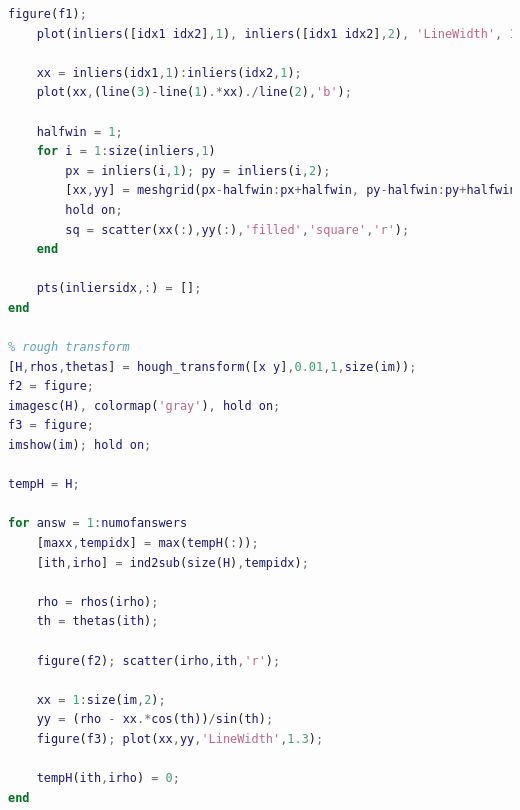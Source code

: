 \documentclass{article}
\begin{document}
\begin{lstlisting}[language=Matlab]
    figure(f1);
    plot(inliers([idx1 idx2],1), inliers([idx1 idx2],2), 'LineWidth', 1.2);

    xx = inliers(idx1,1):inliers(idx2,1);
    plot(xx,(line(3)-line(1).*xx)./line(2),'b');
    
    halfwin = 1;
    for i = 1:size(inliers,1)
        px = inliers(i,1); py = inliers(i,2);
        [xx,yy] = meshgrid(px-halfwin:px+halfwin, py-halfwin:py+halfwin);
        hold on;
        sq = scatter(xx(:),yy(:),'filled','square','r');
    end
    
    pts(inliersidx,:) = [];
end

% rough transform
[H,rhos,thetas] = hough_transform([x y],0.01,1,size(im));
f2 = figure;
imagesc(H), colormap('gray'), hold on;
f3 = figure;
imshow(im); hold on;

tempH = H;

for answ = 1:numofanswers
    [maxx,tempidx] = max(tempH(:));
    [ith,irho] = ind2sub(size(H),tempidx);
    
    rho = rhos(irho);
    th = thetas(ith);

    figure(f2); scatter(irho,ith,'r');

    xx = 1:size(im,2);
    yy = (rho - xx.*cos(th))/sin(th);
    figure(f3); plot(xx,yy,'LineWidth',1.3);
    
    tempH(ith,irho) = 0;
end





\end{lstlisting}
\end{document}
